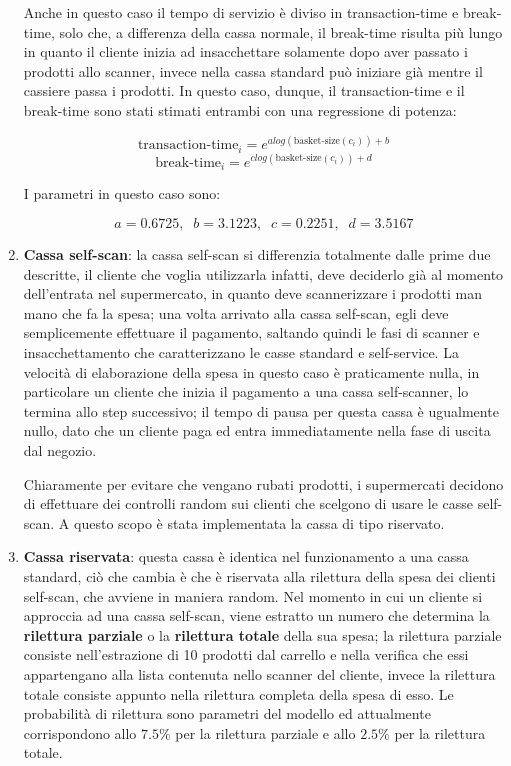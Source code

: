 \begin{enumerate}
Anche in questo caso il tempo di servizio è diviso in transaction-time e break-time, solo che, a differenza della cassa normale, il break-time risulta più lungo in quanto il cliente inizia ad insacchettare solamente dopo aver passato i prodotti allo scanner, invece nella cassa standard può iniziare già mentre il cassiere passa i prodotti. In questo caso, dunque, il transaction-time e il break-time sono stati stimati entrambi con una regressione di potenza:

\begin{equation}\label{eq:transaction-time-self-service}
\text{transaction-time}_i = e^{a log(\text{basket-size}(c_i)) + b}
\end{equation}
\begin{equation}\label{eq:break-time-self-service}
\text{break-time}_i = e^{c log(\text{basket-size}(c_i)) + d}
\end{equation}

I parametri in questo caso sono:

\begin{equation}
a = 0.6725, \;\; b = 3.1223, \;\; c = 0.2251, \;\; d = 3.5167
\end{equation}

\item \textbf{Cassa self-scan}: la cassa self-scan si differenzia totalmente dalle prime due descritte, il cliente che voglia utilizzarla infatti, deve deciderlo già al momento dell'entrata nel supermercato, in quanto deve scannerizzare i prodotti man mano che fa la spesa; una volta arrivato alla cassa self-scan, egli deve semplicemente effettuare il pagamento, saltando quindi le fasi di scanner e insacchettamento che caratterizzano le casse standard e self-service. La velocità di elaborazione della spesa in questo caso è praticamente nulla, in particolare un cliente che inizia il pagamento a una cassa self-scanner, lo termina allo step successivo; il tempo di pausa per questa cassa è ugualmente nullo, dato che un cliente paga ed entra immediatamente nella fase di uscita dal negozio.

Chiaramente per evitare che vengano rubati prodotti, i supermercati decidono di effettuare dei controlli random sui clienti che scelgono di usare le casse self-scan. A questo scopo è stata implementata la cassa di tipo riservato.
\item \textbf{Cassa riservata}: questa cassa è identica nel funzionamento a una cassa standard, ciò che cambia è che è riservata alla rilettura della spesa dei clienti self-scan, che avviene in maniera random. Nel momento in cui un cliente si approccia ad una cassa self-scan, viene estratto un numero che determina la \textbf{rilettura parziale} o la \textbf{rilettura totale} della sua spesa;
la rilettura parziale consiste nell'estrazione di 10 prodotti dal carrello e nella verifica che essi appartengano alla lista contenuta nello scanner del cliente, invece la rilettura totale consiste appunto nella rilettura completa della spesa di esso. Le probabilità di rilettura sono parametri del modello ed attualmente corrispondono allo $7.5 \%$ per la rilettura parziale e allo $2.5 \%$ per la rilettura totale.


\end{enumerate}
